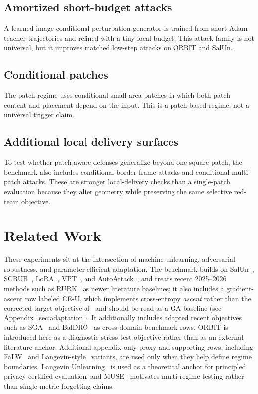 \documentclass[11pt]{article}
\begin{document}
\subsection{Amortized short-budget attacks}
A learned image-conditional perturbation generator is trained from short Adam teacher trajectories and refined with a tiny local budget. This attack family is not universal, but it improves matched low-step attacks on ORBIT and SalUn.

\subsection{Conditional patches}
The patch regime uses conditional small-area patches in which both patch content and placement depend on the input. This is a patch-based regime, not a universal trigger claim.

\subsection{Additional local delivery surfaces}
To test whether patch-aware defenses generalize beyond one square patch, the benchmark also includes conditional border-frame attacks and conditional multi-patch attacks. These are stronger local-delivery checks than a single-patch evaluation because they alter geometry while preserving the same selective red-team objective.



\section{Related Work}
These experiments sit at the intersection of machine unlearning, adversarial robustness, and parameter-efficient adaptation. The benchmark builds on SalUn~\cite{fan2024salun}, SCRUB~\cite{kurmanji2023scrub}, LoRA~\cite{hu2022lora}, VPT~\cite{jia2022vpt}, and AutoAttack~\cite{croce2020autoattack}, and treats recent 2025--2026 methods such as RURK~\cite{hsu2025rurk} as newer literature baselines; it also includes a gradient-ascent row labeled CE-U, which implements cross-entropy \emph{ascent} rather than the corrected-target objective of~\cite{yang2025ceu} and should be read as a GA baseline (see Appendix~\ref{sec:adaptation}). It additionally includes adapted recent objectives such as SGA~\cite{pang2025sga} and BalDRO~\cite{shao2026baldro} as cross-domain benchmark rows. ORBIT is introduced here as a diagnostic stress-test objective rather than as an external literature anchor. Additional appendix-only proxy and supporting rows, including FaLW~\cite{yu2026falw} and Langevin-style~\cite{chien2024langevin} variants, are used only when they help define regime boundaries. Langevin Unlearning~\cite{chien2024langevin} is used as a theoretical anchor for principled privacy-certified evaluation, and MUSE~\cite{shi2024muse} motivates multi-regime testing rather than single-metric forgetting claims.
\end{document}
